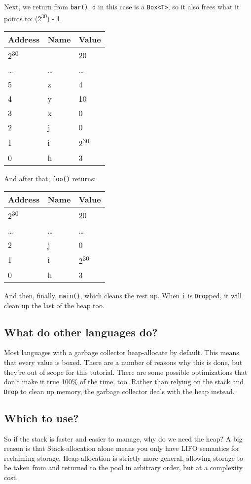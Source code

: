 \documentclass[a4paper,]{book}
\begin{document}
Next, we return from \texttt{bar()}. \texttt{d} in this case is a
\texttt{Box\textless{}T\textgreater{}}, so it also frees what it points
to: (2\textsuperscript{30}) - 1.

\begin{longtable}[c]{@{}lll@{}}
\toprule
Address & Name & Value\tabularnewline
\midrule
\endhead
2\textsuperscript{30} & & 20\tabularnewline
\ldots{} & \ldots{} & \ldots{}\tabularnewline
5 & z & 4\tabularnewline
4 & y & 10\tabularnewline
3 & x & 0\tabularnewline
2 & j & 0\tabularnewline
1 & i & 2\textsuperscript{30}\tabularnewline
0 & h & 3\tabularnewline
\bottomrule
\end{longtable}

And after that, \texttt{foo()} returns:

\begin{longtable}[c]{@{}lll@{}}
\toprule
Address & Name & Value\tabularnewline
\midrule
\endhead
2\textsuperscript{30} & & 20\tabularnewline
\ldots{} & \ldots{} & \ldots{}\tabularnewline
2 & j & 0\tabularnewline
1 & i & 2\textsuperscript{30}\tabularnewline
0 & h & 3\tabularnewline
\bottomrule
\end{longtable}

And then, finally, \texttt{main()}, which cleans the rest up. When
\texttt{i} is \texttt{Drop}ped, it will clean up the last of the heap
too.

\subsection{What do other languages
do?}\label{what-do-other-languages-do}

Most languages with a garbage collector heap-allocate by default. This
means that every value is boxed. There are a number of reasons why this
is done, but they're out of scope for this tutorial. There are some
possible optimizations that don't make it true 100\% of the time, too.
Rather than relying on the stack and \texttt{Drop} to clean up memory,
the garbage collector deals with the heap instead.

\subsection{Which to use?}\label{which-to-use}

So if the stack is faster and easier to manage, why do we need the heap?
A big reason is that Stack-allocation alone means you only have LIFO
semantics for reclaiming storage. Heap-allocation is strictly more
general, allowing storage to be taken from and returned to the pool in
arbitrary order, but at a complexity cost.
\end{document}
